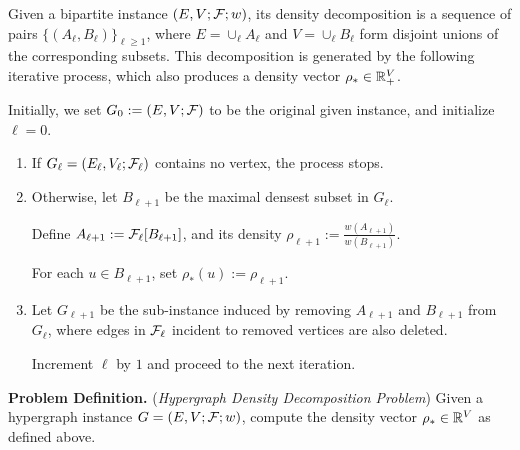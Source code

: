 \begin{definition}\label{def:decomposition}
	Given a bipartite instance $(E, V; \mathcal {F}; w)$,
	its density decomposition is a sequence of pairs
	$\{(A_\ell, B_\ell)\}_{\ell \geq 1}$,
	where $E = \cup_\ell A_\ell$ and $V = \cup_\ell B_\ell$
	form disjoint unions of the corresponding subsets.
	This decomposition is generated by the following iterative process, which also produces a density vector $\rho_* \in \mathbb{R}_+^V$.
	
		
	Initially, we set $G_0 := (E, V; \mathcal {F})$ to be the original given instance, and initialize $\ell = 0$.
	
	\begin{enumerate}
		
		\item If $G_{\ell} =
		(E_{\ell}, V_{\ell}; \mathcal {F}_{\ell})$ contains no vertex, the process stops.
		
		\item Otherwise, let $B_{\ell+1}$ be the maximal densest subset in $G_{\ell}$.
		
		Define  $A_{\ell+1} := \mathcal {F}_\ell[B_{\ell+1}]$,
		and its density $\rho_{\ell+1} := \frac{w(A_{\ell+1})}{w(B_{\ell+1})}$.
		
		For each $u \in B_{\ell+1}$, set $\rho_*(u) := \rho_{\ell+1}$.
		
		\item Let $G_{\ell+1}$ be the sub-instance induced by removing $A_{\ell+1}$ and
		$B_{\ell+1}$ from $G_{\ell}$, where edges in $\mathcal {F}_\ell$ incident to removed vertices are also deleted.
		
		Increment $\ell$ by $1$ and proceed to the next iteration.
		
	\end{enumerate}
\end{definition} 



\noindent \textbf{Problem Definition. }(\textit{Hypergraph Density Decomposition Problem})
Given a hypergraph instance $G = (E, V; \mathcal {F}; w)$, compute the density vector $\rho_* \in \mathbb{R}^V$ as defined above.

